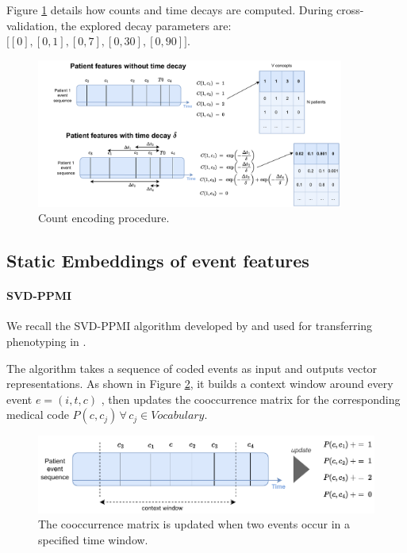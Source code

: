 \documentclass[french,12pt,twoside,a4paper]{book}
\begin{document}
\begin{appendices}
  Figure \ref{apd:fig:pipelines:count_encoding} details how counts and time decays
  are computed. During cross-validation, the explored decay parameters are:
  $\big[[0], [0, 1], [0, 7], [0, 30], [0, 90]\big]$.

  \begin{figure}
    \includegraphics[width=0.9\textwidth]{img/chapter_3/patient_counter_with_decay.pdf}
    \caption{Count encoding procedure.}\label{apd:fig:pipelines:count_encoding}
  \end{figure}

  \subsection{Static Embeddings of event features}\label{apd:pipelines:static_embeddings}

  \paragraph{SVD-PPMI}\label{apd:medical_concept_embeddings:svdppmi} We recall the
  SVD-PPMI algorithm developed by \cite{beam2019clinical} and used for
  transferring phenotyping in \cite{hong2021clinical}.

  The algorithm takes a sequence of coded events as input and outputs vector
  representations. As shown in Figure \ref{fig:cooccurrence}, it builds a
  context window around every event $e=(i,t, c)$ , then updates the cooccurrence matrix for
  the corresponding medical code $P(c, c_j) \, \forall \, c_j \in Vocabulary$.

  \begin{figure}[htbp]
    \begin{center}
      \includegraphics[width=0.9\linewidth]{img/chapter_3/cooccurrence.pdf}
    \end{center}
    \caption{The cooccurrence matrix is updated when two events occur in a
      specified time window.} \label{fig:cooccurrence}
  \end{figure}


\end{appendices}
\end{document}
